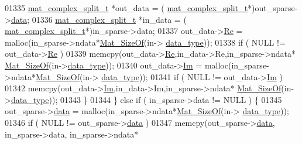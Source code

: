 \begin{DoxyCode}
{{{{{{{{{{{{{{{{{{{{{{{{{{{{{{01335                     \hyperlink{group___m_a_t_structmat__complex__split__t}{mat\_complex\_split\_t} *out\_data = (
      \hyperlink{group___m_a_t_structmat__complex__split__t}{mat\_complex\_split\_t}*)out\_sparse->\hyperlink{group___m_a_t_ae2c648cb9eac4ce47f26cddb44246152}{data};
01336                     \hyperlink{group___m_a_t_structmat__complex__split__t}{mat\_complex\_split\_t} *in\_data  = (
      \hyperlink{group___m_a_t_structmat__complex__split__t}{mat\_complex\_split\_t}*)in\_sparse->data;
01337                     out\_data->\hyperlink{group___m_a_t_a484a93607508adac2bce53a0252e0325}{Re} = malloc(in\_sparse->ndata*\hyperlink{group__mat__util_gab6774aabdc124c540c1e7686d0804940}{Mat\_SizeOf}(in->
      \hyperlink{group___m_a_t_ab6aafe9bd77f0f077852593dec438144}{data\_type}));
01338                     \textcolor{keywordflow}{if} ( NULL != out\_data->\hyperlink{group___m_a_t_a484a93607508adac2bce53a0252e0325}{Re} )
01339                         memcpy(out\_data->\hyperlink{group___m_a_t_a484a93607508adac2bce53a0252e0325}{Re},in\_data->Re,in\_sparse->ndata*
      \hyperlink{group__mat__util_gab6774aabdc124c540c1e7686d0804940}{Mat\_SizeOf}(in->\hyperlink{group___m_a_t_ab6aafe9bd77f0f077852593dec438144}{data\_type}));
01340                     out\_data->\hyperlink{group___m_a_t_a7182d10b0d3598415887376065440946}{Im} = malloc(in\_sparse->ndata*\hyperlink{group__mat__util_gab6774aabdc124c540c1e7686d0804940}{Mat\_SizeOf}(in->
      \hyperlink{group___m_a_t_ab6aafe9bd77f0f077852593dec438144}{data\_type}));
01341                     \textcolor{keywordflow}{if} ( NULL != out\_data->\hyperlink{group___m_a_t_a7182d10b0d3598415887376065440946}{Im} )
01342                         memcpy(out\_data->\hyperlink{group___m_a_t_a7182d10b0d3598415887376065440946}{Im},in\_data->Im,in\_sparse->ndata*
      \hyperlink{group__mat__util_gab6774aabdc124c540c1e7686d0804940}{Mat\_SizeOf}(in->\hyperlink{group___m_a_t_ab6aafe9bd77f0f077852593dec438144}{data\_type}));
01343                 \}
01344             \} \textcolor{keywordflow}{else} \textcolor{keywordflow}{if} ( in\_sparse->data != NULL ) \{
01345                 out\_sparse->\hyperlink{group___m_a_t_ae2c648cb9eac4ce47f26cddb44246152}{data} = malloc(in\_sparse->ndata*\hyperlink{group__mat__util_gab6774aabdc124c540c1e7686d0804940}{Mat\_SizeOf}(in->
      \hyperlink{group___m_a_t_ab6aafe9bd77f0f077852593dec438144}{data\_type}));
01346                 \textcolor{keywordflow}{if} ( NULL != out\_sparse->\hyperlink{group___m_a_t_ae2c648cb9eac4ce47f26cddb44246152}{data} )
01347                     memcpy(out\_sparse->\hyperlink{group___m_a_t_ae2c648cb9eac4ce47f26cddb44246152}{data}, in\_sparse->data, in\_sparse->ndata*
}}}}}}}}}}}}}}}}}}}}}}}}}}}}}}
\end{DoxyCode}
